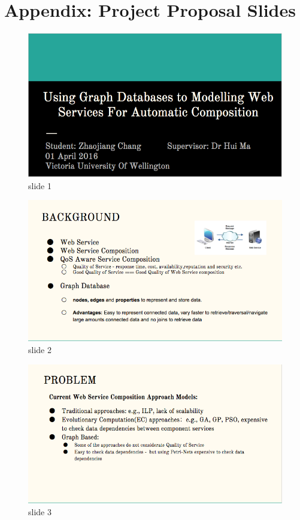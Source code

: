 \appendix
\chapter{Appendix: Project Proposal Slides}
\begin{figure}[h]
\includegraphics[width=15cm]{1.png}
\centering
\caption{slide 1}
\end{figure}

\begin{figure}[h]
\includegraphics[width=15cm]{2.png}
\centering
\caption{slide 2}
\end{figure}

\begin{figure}[h]
\includegraphics[width=15cm]{3.png}
\centering
\caption{slide 3}
\end{figure}

